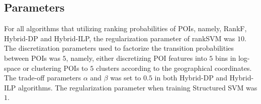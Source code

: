 \subsection{Parameters}
For all algorithms that utilizing ranking probabilities of POIs, namely, RankF, Hybrid-DP and Hybrid-ILP,
the regularization parameter of rankSVM was $10$.
The discretization parameters used to factorize the transition probabilities between POIs was $5$, namely,
either discretizing POI features into $5$ bins in log-space or clustering POIs to $5$ clusters according to the geographical coordinates.
The trade-off parameters $\alpha$ and $\beta$ was set to $0.5$ in both Hybrid-DP and Hybrid-ILP algorithms.
The regularization parameter when training Structured SVM was $1$.




